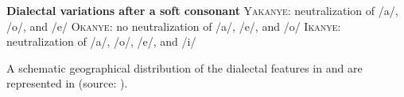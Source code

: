 \documentclass[output=paper,
modfonts,
newtxmath,
hidelinks,
]{langscibook}
\begin{document}
\ea \textbf{Dialectal variations after a soft consonant}\label{12}
\ea \textsc{Yakanye:} neutralization of /a/, /o/, and /e/
\ex \textsc{Okanye:} no neutralization of /a/, /e/, and /o/
\ex \textsc{Ikanye:} neutralization of /a/, /o/, /e/, and /i/
\z\z

\noindent A schematic geographical distribution of the dialectal features in  and  are represented in  (source: \citealt{Bukrinskaja-etal1994}).

\begin{figure}
\end{figure}
\end{document}
